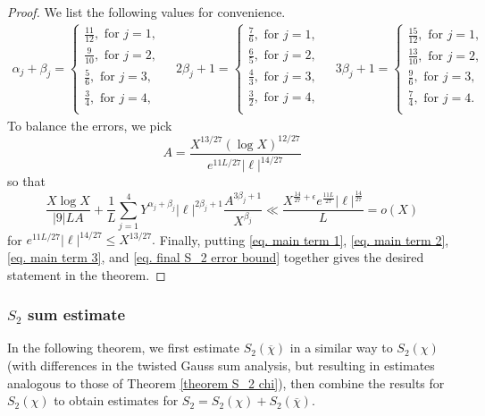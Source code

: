 \documentclass[11pt]{amsart}
\numberwithin{equation}{section}
\theoremstyle{remark}
\begin{document}
\begin{proof}
We list the following values for convenience.
\begin{align*}
    \alpha_j+\beta_j=
    \begin{cases}
        \frac{11}{12}, \text{ for } j=1,\\
        \frac{9}{10}, \text{ for } j=2,\\
        \frac{5}{6}, \text{ for } j=3,\\
        \frac{3}{4}, \text{ for } j=4,\\
    \end{cases} \ \ \ \ \ 
    2\beta_j+1=
    \begin{cases}
        \frac{7}{6}, \text{ for } j=1,\\
        \frac{6}{5}, \text{ for } j=2,\\
        \frac{4}{3}, \text{ for } j=3,\\
        \frac{3}{2}, \text{ for } j=4,\\
    \end{cases} 
    \ \ \ \ \ 
    3\beta_j+1=
    \begin{cases}
        \frac{15}{12}, \text{ for } j=1,\\
        \frac{13}{10}, \text{ for } j=2,\\
        \frac{9}{6}, \text{ for } j=3,\\
        \frac{7}{4}, \text{ for } j=4.\\
    \end{cases} 
\end{align*}
To balance the errors, we pick
$$A=\frac{X^{13/27}(\log X)^{12/27}}{e^{11L/27}|\ell|^{14/27}}$$
so that
$$\frac{X\log X}{|9|LA}
+
\frac{1}{L}\sum_{j=1}^4{Y^{\alpha_j + \beta_j} |\ell|^{2\beta_j +1}\frac{A^{3\beta_j+1}}{X^{\beta_j}} }
\ll
\frac{X^{\frac{14}{27}+\epsilon}e^{\frac{11L}{27}}|\ell|^{\frac{14}{27}}}{L}
=o\left(X\right)
$$
for $e^{11L/27}|\ell|^{14/27}\le X^{13/27}.$ Finally, putting \eqref{eq. main term 1}, \eqref{eq. main term 2}, \eqref{eq. main term 3}, and \eqref{eq. final S_2 error bound} together gives the desired statement in the theorem.
\end{proof}


\subsubsection{$S_2$ sum estimate}

In the following theorem, we first estimate $S_2(\overline{\chi})$ in a similar way to $S_2(\chi)$ (with differences in the twisted Gauss sum analysis, but resulting in estimates analogous to those of Theorem \ref{theorem S_2 chi}), then combine the results for $S_2(\chi)$ to obtain estimates for 
$
S_2=S_2(\chi)+S_2(\overline{\chi}).
$
\end{document}

